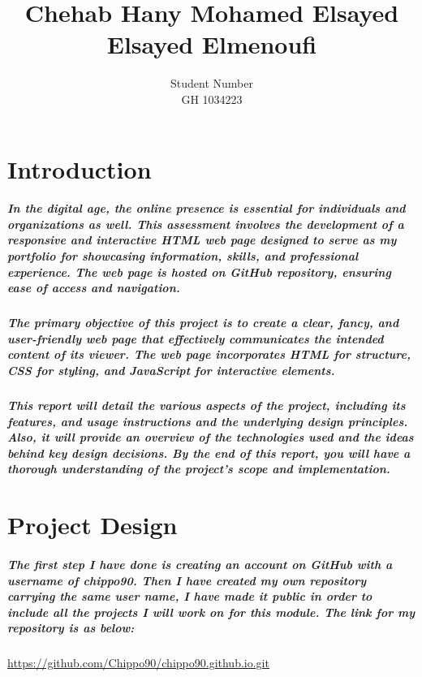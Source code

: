\documentclass[12pt, letterpaper]{template}
\title{Chehab Hany Mohamed Elsayed Elsayed Elmenoufi}
\author{Student Number\\GH 1034223}
\begin{document}
\chapter{Introduction}\label{ch:in}

\paragraph {\Large In the digital age, the online presence is essential for individuals and organizations as well. This assessment involves the development of a responsive and interactive HTML web page designed to serve as my portfolio for showcasing information, skills, and professional experience. The web page is hosted on GitHub repository, ensuring ease of access and navigation.}

\paragraph{\Large The primary objective of this project is to create a clear, fancy, and user-friendly web page that effectively communicates the intended content of its viewer. The web page incorporates HTML for structure, CSS for styling, and JavaScript for interactive elements.}

\paragraph{\Large This report will detail the various aspects of the project, including its features, and usage instructions and the underlying design principles. Also, it will provide an overview of the technologies used and the ideas behind key design decisions. By the end of this report, you will have a thorough understanding of the project's scope and implementation.}
\chapter{Project Design}

\paragraph{\Large The first step I have done is creating an account on GitHub with a username of chippo90. Then I have created my own repository carrying the same user name, I have made it public in order to include all the projects I will work on for this module. The link for my repository is as below:}
\begin{center}
    \Large\url{ https://github.com/Chippo90/chippo90.github.io.git}
\end{center}
\end{document}
